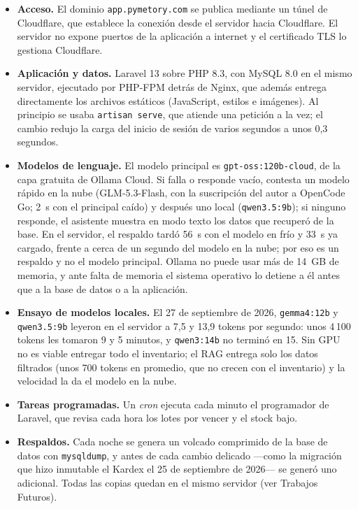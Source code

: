 \begin{itemize}
    \item \textbf{Acceso.} El dominio \texttt{app.pymetory.com} se publica mediante un túnel de Cloudflare, que establece la conexión desde el servidor hacia Cloudflare. El servidor no expone puertos de la aplicación a internet y el certificado TLS lo gestiona Cloudflare.
    \item \textbf{Aplicación y datos.} Laravel 13 sobre PHP 8.3, con MySQL 8.0 en el mismo servidor, ejecutado por PHP-FPM detrás de Nginx, que además entrega directamente los archivos estáticos (JavaScript, estilos e imágenes). Al principio se usaba \texttt{artisan serve}, que atiende una petición a la vez; el cambio redujo la carga del inicio de sesión de varios segundos a unos 0,3 segundos.
    \item \textbf{Modelos de lenguaje.} El modelo principal es \texttt{gpt-oss:120b-cloud}, de la capa gratuita de Ollama Cloud. Si falla o responde vacío, contesta un modelo rápido en la nube (GLM-5.3-Flash, con la suscripción del autor a OpenCode Go; 2~s con el principal caído) y después uno local (\texttt{qwen3.5:9b}); si ninguno responde, el asistente muestra en modo texto los datos que recuperó de la base. En el servidor, el respaldo tardó 56~s con el modelo en frío y 33~s ya cargado, frente a cerca de un segundo del modelo en la nube; por eso es un respaldo y no el modelo principal. Ollama no puede usar más de 14~GB de memoria, y ante falta de memoria el sistema operativo lo detiene a él antes que a la base de datos o a la aplicación.
    \item \textbf{Ensayo de modelos locales.} El 27 de septiembre de 2026, \texttt{gemma4:12b} y \texttt{qwen3.5:9b} leyeron en el servidor a 7,5 y 13,9 tokens por segundo: unos 4\,100 tokens les tomaron 9 y 5 minutos, y \texttt{qwen3:14b} no terminó en 15. Sin GPU no es viable entregar todo el inventario; el RAG entrega solo los datos filtrados (unos 700 tokens en promedio, que no crecen con el inventario) y la velocidad la da el modelo en la nube.
    \item \textbf{Tareas programadas.} Un \textit{cron} ejecuta cada minuto el programador de Laravel, que revisa cada hora los lotes por vencer y el stock bajo.
    \item \textbf{Respaldos.} Cada noche se genera un volcado comprimido de la base de datos con \texttt{mysqldump}, y antes de cada cambio delicado ---como la migración que hizo inmutable el Kardex el 25 de septiembre de 2026--- se generó uno adicional. Todas las copias quedan en el mismo servidor (ver Trabajos Futuros).
\end{itemize}


